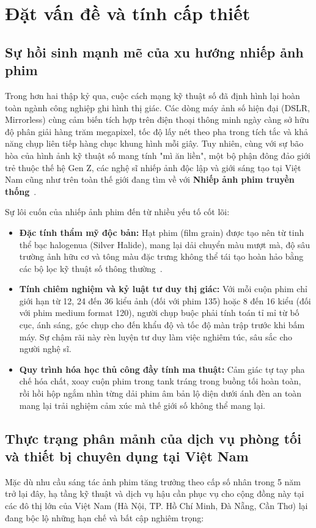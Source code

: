 \section{Đặt vấn đề và tính cấp thiết}

\subsection{Sự hồi sinh mạnh mẽ của xu hướng nhiếp ảnh phim}
Trong hơn hai thập kỷ qua, cuộc cách mạng kỹ thuật số đã định hình lại hoàn toàn ngành công nghiệp ghi hình thị giác. Các dòng máy ảnh số hiện đại (DSLR, Mirrorless) cùng cảm biến tích hợp trên điện thoại thông minh ngày càng sở hữu độ phân giải hàng trăm megapixel, tốc độ lấy nét theo pha trong tích tắc và khả năng chụp liên tiếp hàng chục khung hình mỗi giây. Tuy nhiên, cùng với sự bão hòa của hình ảnh kỹ thuật số mang tính "mì ăn liền", một bộ phận đông đảo giới trẻ thuộc thế hệ Gen Z, các nghệ sĩ nhiếp ảnh độc lập và giới sáng tạo tại Việt Nam cũng như trên toàn thế giới đang tìm về với \textbf{Nhiếp ảnh phim truyền thống}~\cite{edwards2023tactility}.

Sự lôi cuốn của nhiếp ảnh phim đến từ nhiều yếu tố cốt lõi:
\begin{itemize}[leftmargin=2em]
    \item \textbf{Đặc tính thẩm mỹ độc bản:} Hạt phim (film grain) được tạo nên từ tinh thể bạc halogenua (Silver Halide), mang lại dải chuyển màu mượt mà, độ sâu trường ảnh hữu cơ và tông màu đặc trưng không thể tái tạo hoàn hảo bằng các bộ lọc kỹ thuật số thông thường~\cite{edwards2023tactility, su2024deep}.
    \item \textbf{Tính chiêm nghiệm và kỷ luật tư duy thị giác:} Với mỗi cuộn phim chỉ giới hạn từ 12, 24 đến 36 kiểu ảnh (đối với phim 135) hoặc 8 đến 16 kiểu (đối với phim medium format 120), người chụp buộc phải tính toán tỉ mỉ từ bố cục, ánh sáng, góc chụp cho đến khẩu độ và tốc độ màn trập trước khi bấm máy. Sự chậm rãi này rèn luyện tư duy làm việc nghiêm túc, sâu sắc cho người nghệ sĩ.
    \item \textbf{Quy trình hóa học thủ công đầy tính ma thuật:} Cảm giác tự tay pha chế hóa chất, xoay cuộn phim trong tank tráng trong buồng tối hoàn toàn, rồi hồi hộp ngắm nhìn từng dải phim âm bản lộ diện dưới ánh đèn an toàn mang lại trải nghiệm cảm xúc mà thế giới số không thể mang lại.
\end{itemize}

\subsection{Thực trạng phân mảnh của dịch vụ phòng tối và thiết bị chuyên dụng tại Việt Nam}
Mặc dù nhu cầu sáng tác ảnh phim tăng trưởng theo cấp số nhân trong 5 năm trở lại đây, hạ tầng kỹ thuật và dịch vụ hậu cần phục vụ cho cộng đồng này tại các đô thị lớn của Việt Nam (Hà Nội, TP. Hồ Chí Minh, Đà Nẵng, Cần Thơ) lại đang bộc lộ những hạn chế và bất cập nghiêm trọng:

